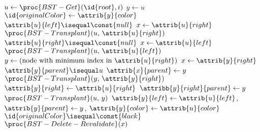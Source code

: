 \begin{codebox}
\li $u \gets \proc{BST-Get}(\id{root}, i)$
\li $y \gets u$
\li $\id{originalColor} \gets \attrib{y}{color}$
\li \If $\attrib{u}{left} \isequal \const{null}$ \Then
\li     $x \gets \attrib{u}{right}$
\li     $\proc{BST-Transplant}(u,\,\attrib{u}{right})$
\li \ElseIf $\attrib{u}{right} \isequal \const{null}$ \Then
\li     $x \gets \attrib{u}{left}$
\li     $\proc{BST-Transplant}(u,\,\attrib{u}{left})$
\li \ElseNoIf
\li     $y \gets \mbox{(node with minimum index in }\attrib{u}{right}\mbox{)}$
\li     $x \gets \attrib{y}{right}$
\li     \If $\attrib{y}{parent} \isequal u$ \Then
\li         $\attrib{x}{parent} \gets y$
\li     \ElseNoIf
\li         $\proc{BST-Transplant}(y,\,\attrib{y}{right})$
\li         $\attrib{y}{right} \gets \attrib{u}{right}$
\li         $\attribb{y}{right}{parent} \gets y$
        \End
\li     $\proc{BST-Transplant}(u,\,y)$
\li     $\attrib{y}{left} \gets \attrib{u}{left}$, $\attrib{y}{parent} \gets y$, $\attrib{y}{color} \gets \attrib{u}{color}$
\li     \If $\id{originalColor} \isequal \const{black}$ \Then
\li         $\proc{BST-Delete-Revalidate}(x)$
        \End
    \End
\end{codebox}

\newpage

